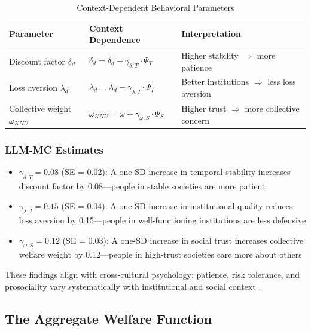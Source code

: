 \begin{table}[htbp]
\centering
\caption{Context-Dependent Behavioral Parameters}
\label{tab:context-params}
\renewcommand{\arraystretch}{1.3}
\begin{tabular}{@{}lll@{}}
\toprule
\textbf{Parameter} & \textbf{Context Dependence} & \textbf{Interpretation} \\
\midrule
Discount factor $\delta_d$ & $\delta_d = \bar{\delta}_d + \gamma_{\delta,T} \cdot \Psi_T$ & Higher stability $\Rightarrow$ more patience \\
Loss aversion $\lambda_d$ & $\lambda_d = \bar{\lambda}_d - \gamma_{\lambda,I} \cdot \Psi_I$ & Better institutions $\Rightarrow$ less loss aversion \\
Collective weight $\omega_{KNU}$ & $\omega_{KNU} = \bar{\omega} + \gamma_{\omega,S} \cdot \Psi_S$ & Higher trust $\Rightarrow$ more collective concern \\
\bottomrule
\end{tabular}
\end{table}

\subsubsection{LLM-MC Estimates}

\begin{itemize}
  \item $\gamma_{\delta,T} = 0.08$ (SE = 0.02): A one-SD increase in temporal stability increases discount factor by 0.08---people in stable societies are more patient
  \item $\gamma_{\lambda,I} = 0.15$ (SE = 0.04): A one-SD increase in institutional quality reduces loss aversion by 0.15---people in well-functioning institutions are less defensive
  \item $\gamma_{\omega,S} = 0.12$ (SE = 0.03): A one-SD increase in social trust increases collective welfare weight by 0.12---people in high-trust societies care more about others
\end{itemize}

These findings align with cross-cultural psychology: patience, risk tolerance, and prosociality
vary systematically with institutional and social context \citep{PAP-enke2019globalpref}.

\subsection{The Aggregate Welfare Function}

